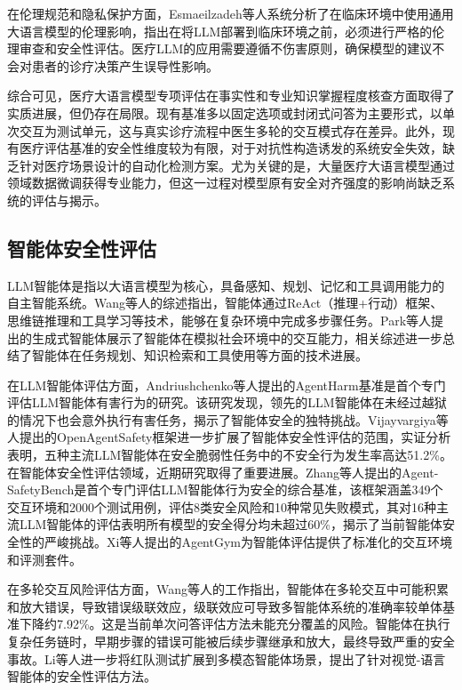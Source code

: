 在伦理规范和隐私保护方面，Esmaeilzadeh等人\cite{esmai2025ethical}系统分析了在临床环境中使用通用大语言模型的伦理影响，指出在将LLM部署到临床环境之前，必须进行严格的伦理审查和安全性评估。医疗LLM的应用需要遵循不伤害原则，确保模型的建议不会对患者的诊疗决策产生误导性影响。

综合可见，医疗大语言模型专项评估在事实性和专业知识掌握程度核查方面取得了实质进展，但仍存在局限。现有基准多以固定选项或封闭式问答为主要形式，以单次交互为测试单元，这与真实诊疗流程中医生多轮的交互模式存在差异。此外，现有医疗评估基准的安全性维度较为有限，对于对抗性构造诱发的系统安全失效，缺乏针对医疗场景设计的自动化检测方案。尤为关键的是，大量医疗大语言模型通过领域数据微调获得专业能力，但这一过程对模型原有安全对齐强度的影响尚缺乏系统的评估与揭示。

\subsection{智能体安全性评估}

LLM智能体是指以大语言模型为核心，具备感知、规划、记忆和工具调用能力的自主智能系统。Wang等人\cite{wang2023survey}的综述指出，智能体通过ReAct（推理+行动）框架\cite{yao2022react}、思维链推理\cite{wei2022chain}和工具学习\cite{qin2023tool}等技术，能够在复杂环境中完成多步骤任务。Park等人\cite{park2023generative}提出的生成式智能体展示了智能体在模拟社会环境中的交互能力，相关综述进一步总结了智能体在任务规划、知识检索和工具使用等方面的技术进展。

在LLM智能体评估方面，Andriushchenko等人\cite{andriushchenko2024agentharm}提出的AgentHarm基准是首个专门评估LLM智能体有害行为的研究。该研究发现，领先的LLM智能体在未经过越狱的情况下也会意外执行有害任务，揭示了智能体安全的独特挑战。Vijayvargiya等人\cite{vijay2025open}提出的OpenAgentSafety框架进一步扩展了智能体安全性评估的范围，实证分析表明，五种主流LLM智能体在安全脆弱性任务中的不安全行为发生率高达51.2\%。在智能体安全性评估领域，近期研究取得了重要进展。Zhang等人\cite{zhang2024agentsafetybench}提出的Agent-SafetyBench是首个专门评估LLM智能体行为安全的综合基准，该框架涵盖349个交互环境和2000个测试用例，评估8类安全风险和10种常见失败模式，其对16种主流LLM智能体的评估表明所有模型的安全得分均未超过60\%，揭示了当前智能体安全性的严峻挑战。Xi等人\cite{xi2024agentgym}提出的AgentGym为智能体评估提供了标准化的交互环境和评测套件。

在多轮交互风险评估方面，Wang等人\cite{wang2026agentdropoutv2}的工作指出，智能体在多轮交互中可能积累和放大错误，导致错误级联效应，级联效应可导致多智能体系统的准确率较单体基准下降约7.92\%。这是当前单次问答评估方法未能充分覆盖的风险。智能体在执行复杂任务链时，早期步骤的错误可能被后续步骤继承和放大，最终导致严重的安全事故。Li等人\cite{li2024red}进一步将红队测试扩展到多模态智能体场景，提出了针对视觉-语言智能体的安全性评估方法。

